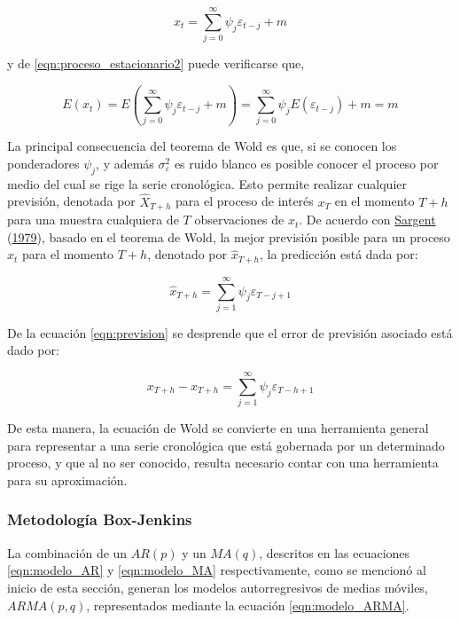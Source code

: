 \documentclass[
]{article}
\begin{document}
\begin{equation}
\label{eqn:proceso_estacionario2}
x_t=\sum_{j=0}^{\infty} \psi_j\varepsilon_{t-j}+m
\end{equation}

y de \ref{eqn:proceso_estacionario2} puede verificarse que,

\begin{equation}
\label{eqn:dem_proceso_estacionario2}
E(x_t)=E\left(\sum_{j=0}^{\infty} \psi_j\varepsilon_{t-j}+m\right)=\sum_{j=0}^{\infty} \psi_jE\left(\varepsilon_{t-j}\right) + m = m
\end{equation}

La principal consecuencia del teorema de Wold es que, si se conocen los
ponderadores \(\psi_j\), y además \(\sigma_\varepsilon^2\) es ruido
blanco es posible conocer el proceso por medio del cual se rige la serie
cronológica. Esto permite realizar cualquier previsión, denotada por
\(\hat X_{T+h}\) para el proceso de interés \(x_T\) en el momento
\(T+h\) para una muestra cualquiera de \(T\) observaciones de \(x_t\).
De acuerdo con \protect\hyperlink{ref-sargent_macro}{Sargent}
(\protect\hyperlink{ref-sargent_macro}{1979}), basado en el teorema de
Wold, la mejor previsión posible para un proceso \(x_t\) para el momento
\(T+h\), denotado por \(\hat x_{T+h}\), la predicción está dada por:

\begin{equation}
\label{eqn:prevision}
\hat x_{T+h}=\sum_{j=1}^{\infty} \psi_j \varepsilon_{T-j+1}
\end{equation}

De la ecuación \ref{eqn:prevision} se desprende que el error de
previsión asociado está dado por:

\begin{equation}
\label{eqn:error_prevision}
x_{T+h}- \hat x_{T+h}=\sum_{j=1}^{\infty} \psi_j \varepsilon_{T-h+1}
\end{equation}

De esta manera, la ecuación de Wold se convierte en una herramienta
general para representar a una serie cronológica que está gobernada por
un determinado proceso, y que al no ser conocido, resulta necesario
contar con una herramienta para su aproximación.

\subsubsection{Metodología Box-Jenkins}

La combinación de un \(AR(p)\) y un \(MA(q)\), descritos en las
ecuaciones \ref{eqn:modelo_AR} y \ref{eqn:modelo_MA} respectivamente,
como se mencionó al inicio de esta sección, generan los modelos
autorregresivos de medias móviles, \(ARMA(p,q)\), representados mediante
la ecuación \ref{eqn:modelo_ARMA}.
\end{document}
